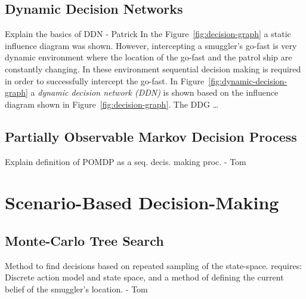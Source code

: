 \documentclass[conference]{IEEEtran}
\begin{document}


\subsection{Dynamic Decision Networks}

{\red Explain the basics of DDN - Patrick}
In the Figure~\ref{fig:decision-graph} a static influence diagram was shown. However, intercepting a smuggler's go-fast is very dynamic environment where the location of the go-fast and the patrol ship are constantly changing. In these environment sequential decision making is required in order to successfully intercept the go-fast. In Figure~\ref{fig:dynamic-decision-graph} a {\em dynamic decision network (DDN)} is shown based on the influence diagram shown in Figure~\ref{fig:decision-graph}. The DDG \ldots

\subsection{Partially Observable Markov Decision Process}

{\red Explain definition of POMDP as a seq. decis. making proc. - Tom}



\section{Scenario-Based Decision-Making}

\subsection{Monte-Carlo Tree Search}

{\red Method to find decisions based on repeated sampling of the state-space. requires: Discrete action model and state space, and a method of defining the current belief of the smuggler's location. - Tom}
\end{document}
